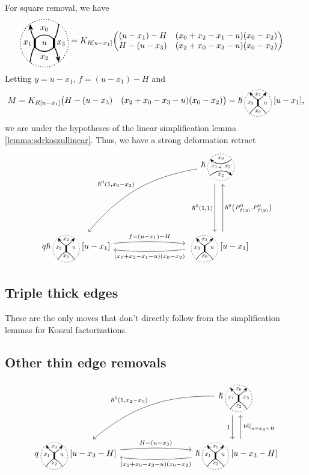 \documentclass{article}
\newcommand{\id}{\mathrm{id}}
\newcommand{\kmf}[2]{
	K_{#1}{\begin{pmatrix}
			#2
		\end{pmatrix}
	}	
}
\theoremstyle{plain} %
\theoremstyle{definition} %
\theoremstyle{remark} %
\begin{document}
For square removal, we have
\begin{align*}
	\SquareStandard{u} 
	&
	= \kmf{R[u-x_1]}
	{		(u-x_1)-H & (x_0+x_2-x_1-u)(x_0-x_2)\\
		H-(u-x_3) & (x_2+x_0-x_3-u)(x_0-x_2)
	}
\end{align*}
Letting $y=u-x_1$, $f=(u-x_1)-H$ and 
$$
M=\kmf{R[u-x_1]}
{
	H-(u-x_3) & (x_2+x_0-x_3-u)(x_0-x_2)
} = \hslash\scalebox{0.7}{\ThickEdge{x_2}{x_3}{x_0}{u}}[u-x_1] 
,
$$
we are under the hypotheses of the linear simplification lemma \ref{lemma:sdrkoszullinear}. Thus, we have a strong deformation retract
\[
\begin{tikzcd}[column sep=3cm, row sep=2cm]
	&
	\hslash \scalebox{0.7}{\UnorientedVerticalThinEdge{x_0}{x_1}{x_2}{x_3}{-}} 
	\arrow[d, shift right=2, "{\hslash^0(1,1)}", swap] 
	\arrow[dl, bend right=20, "{\hslash^0(1,x_0-x_2)}",swap] 
	\\   
	q\hslash \scalebox{0.7}{\ThickEdge{x_2}{x_3}{x_0}{u}}[u-x_1] 
	\arrow[r, "f=(u-x_1)-H", bend left=5]
	& 
	\scalebox{0.7}{\ThickEdge{x_2}{x_3}{x_0}{u}}[u-x_1] 
	\arrow[l, "(x_0+x_2-x_1-u)(x_0-x_2)", bend left=5]
	\arrow[u, shift right=2, "{\hslash^0\left(P^0_{f(y)}, P^0_{f(y)}\right)}",swap]
\end{tikzcd}
\]

\subsection{Triple thick edges}
These are the only moves that don't directly follow from the simplification lemmas for Koszul factorizations.



\subsection{Other thin edge removals}
\[
\begin{tikzcd}[column sep=3cm, row sep=1cm]
	& \hslash\scalebox{0.7}{\ThickEdgeStandard} \arrow[d, shift right=2, "1", swap] \arrow[dl, bend right=20, "{\hslash^0(1,x_2-x_0)}", swap] 
	\\q\scalebox{0.7}{\ThickEdge{x_0}{x_1}{x_2}{u}}[u-x_3-H] \arrow[r, "H-(u-x_3)", bend left=5]
	& \hslash\scalebox{0.7}{\ThickEdge{x_0}{x_1}{x_2}{u}}[u-x_3-H] \arrow[l, "(x_2+x_0-x_3-u)(x_0-x_2)", bend left=5]\arrow[u, shift right=2, "{\left.\id\right|_{u=x_3+H}}",swap]
\end{tikzcd}
\]
\end{document}
